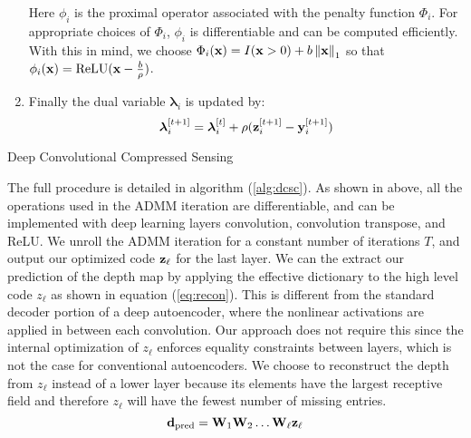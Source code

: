 \begin{enumerate}
  Here $\phi_i$ is the proximal operator associated with the penalty function $\Phi_i$. For appropriate choices of $\Phi_i$, $\phi_i$ is differentiable and can be computed efficiently. With this in mind, we choose $\Phi_i(\mathbf{x}) = I(\mathbf{x} > 0) + b\left\Vert\mathbf{x}\right\Vert_1$ so that $\phi_i(\mathbf{x}) = \text{ReLU}(\mathbf{x} - \frac{b}{\rho})$.
\item Finally the dual variable $\bm{\lambda}_i$ is updated by:
  \begin{equation}
    \label{eq:lupdate}
    \bm{\lambda}_i^{[t+1]} = \bm{\lambda}_i^{[t]} + \rho(\mathbf{z}_i^{[t+1]} - \mathbf{y}_i^{[t+1]})
  \end{equation}
\end{enumerate}
\begin{algorithm}
  \caption{Deep Convolutional Compressed Sensing}
  \label{alg:dcsc}
\end{algorithm}

The full procedure is detailed in algorithm (\ref{alg:dcsc}).
As shown in above, all the operations used in the ADMM iteration are differentiable, and can be implemented with deep learning layers \eg convolution, convolution transpose, and ReLU. We unroll the ADMM iteration for a constant number of iterations $T$, and output our optimized code $\mathbf{z}_\ell$ for the last layer.
We can the extract our prediction of the depth map by applying the effective dictionary to the high level code $z_{\ell}$ as shown in equation (\ref{eq:recon}). This is different from the standard decoder portion of a deep autoencoder, where the nonlinear activations are applied in between each convolution. Our approach does not require this since the internal optimization of $z_{\ell}$ enforces equality constraints between layers, which is not the case for conventional autoencoders. We choose to reconstruct the depth from $z_{\ell}$ instead of a lower layer because its elements have the largest receptive field and therefore $z_{\ell}$ will have the fewest number of missing entries.
\begin{equation}
  \label{eq:recon}
  \mathbf{d}_\text{pred} = \mathbf{W}_1\mathbf{W}_2\ldots \mathbf{W}_{\ell}\mathbf{z}_{\ell}
\end{equation}

